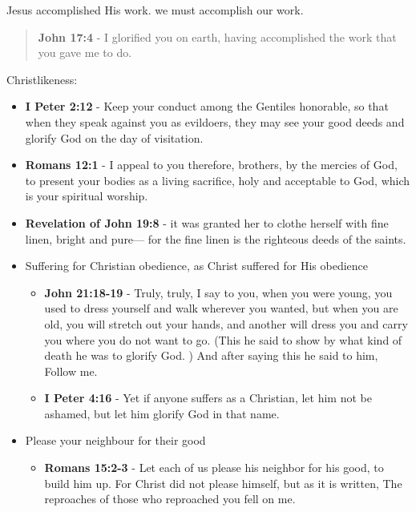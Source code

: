 \documentclass[11pt]{article}
\begin{document}
Jesus accomplished His work.
we must accomplish our work.

\begin{quote}
\textbf{John 17:4} - I glorified you on earth, having accomplished the work that you gave me to do.
\end{quote}

Christlikeness:
\begin{itemize}
\item \textbf{I Peter 2:12} - Keep your conduct among the Gentiles honorable, so that when they speak against you as evildoers, they may see your good deeds and glorify God on the day of visitation.

\item \textbf{Romans 12:1} - I appeal to you therefore, brothers, by the mercies of God, to present your bodies as a living sacrifice, holy and acceptable to God, which is your spiritual worship.

\item \textbf{Revelation of John 19:8} - it was granted her to clothe herself with fine linen, bright and pure— for the fine linen is the righteous deeds of the saints.

\item Suffering for Christian obedience, as Christ suffered for His obedience
\begin{itemize}
\item \textbf{John 21:18-19} - Truly, truly, I say to you, when you were young, you used to dress yourself and walk wherever you wanted, but when you are old, you will stretch out your hands, and another will dress you and carry you where you do not want to go. (This he said to show by what kind of death he was to glorify God. ) And after saying this he said to him, Follow me.
\item \textbf{I Peter 4:16} - Yet if anyone suffers as a Christian, let him not be ashamed, but let him glorify God in that name.
\end{itemize}

\item Please your neighbour for their good
\begin{itemize}
\item \textbf{Romans 15:2-3} - Let each of us please his neighbor for his good, to build him up. For Christ did not please himself, but as it is written, The reproaches of those who reproached you fell on me.
\end{itemize}


\end{itemize}
\end{document}
